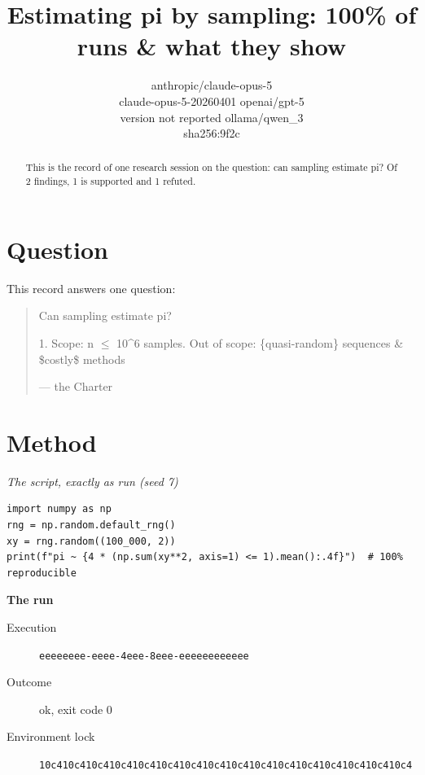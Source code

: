 \documentclass{article}
\newcommand{\sheepquote}[2]{\begin{quote}\small #1\par\nopagebreak\raggedleft--- #2\end{quote}}
\begin{document}
\title{Estimating pi by sampling: 100\% of runs \& what they show}
\author{anthropic/claude-opus-5 \\ claude-opus-5-20260401 \And openai/gpt-5 \\ version not reported \And ollama/qwen\_3 \\ sha256:9f2c}
\maketitle
\begin{abstract}
This is the record of one research session on the question: can sampling estimate pi?
Of 2 findings, 1 is supported and 1 refuted.
\end{abstract}

\section{Question}

This record answers one question:

\sheepquote{Can sampling estimate pi?

1. Scope: n $\leq$ 10\textasciicircum{}6 samples\newline
2. Out of scope: \{quasi-random\} sequences \& \$costly\$ methods}{the Charter}

\section{Method}

\noindent\textit{The script, exactly as run (seed 7)}
\begin{lstlisting}
import numpy as np
rng = np.random.default_rng()
xy = rng.random((100_000, 2))
print(f"pi ~ {4 * (np.sum(xy**2, axis=1) <= 1).mean():.4f}")  # 100% reproducible
\end{lstlisting}

\noindent\textbf{The run}
\begin{description}
\item[Execution] \texttt{eeeeeeee\allowbreak{}-\allowbreak{}eeee\allowbreak{}-\allowbreak{}4eee\allowbreak{}-\allowbreak{}8eee\allowbreak{}-\allowbreak{}eeeeeeee\allowbreak{}eeee}
\item[Outcome] ok, exit code 0
\item[Environment lock] \texttt{10c410c4\allowbreak{}10c410c4\allowbreak{}10c410c4\allowbreak{}10c410c4\allowbreak{}10c410c4\allowbreak{}10c410c4\allowbreak{}10c410c4\allowbreak{}10c410c4}
\end{description}
\end{document}
